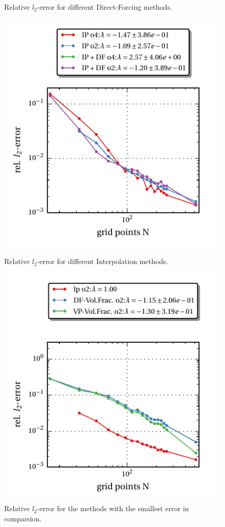 \begin{figure}[!bp]
\begin{minipage}[c]{0.5\textwidth}
      \caption{Relative $l_2$-error for different Direct-Forcing methods.}
  \end{minipage}
  \begin{minipage}[c]{0.5\textwidth}
      \includegraphics{gfx/immersed_boundary/tcflow/theo/ip.pdf}
      \caption{Relative $l_2$-error for different Interpolation methods.}
  \end{minipage}
  \begin{minipage}[c]{0.5\textwidth}
      \includegraphics{gfx/immersed_boundary/tcflow/theo/all.pdf}
      \caption{Relative $l_2$-error for the methods with the smallest error in comparsion.}
  \end{minipage}
\end{figure}
\clearpage

